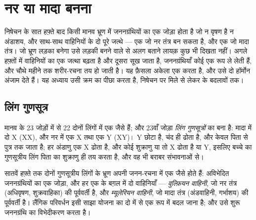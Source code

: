 \chapter{नर या मादा बनना}\label{ch:g11:becoming-male-female}

निषेचन के सात हफ़्ते बाद किसी मानव भ्रूण में जननग्रंथियों का एक जोड़ा होता
है जो न वृषण है न अंडाशय, और साथ-साथ वाहिनियों के दो पूरे जत्थे --- एक जो
नर तंत्र बन सकता है, और एक जो मादा तंत्र। जो भ्रूण लड़का बनेगा उसे लड़की
बनने वाले से अलग बताने लायक़ कुछ भी दिखता नहीं। अगले हफ़्तों में
वाहिनियों का एक जत्था बढ़ता है और दूसरा सूख जाता है, जननग्रंथियाँ कोई एक
रूप ले लेती हैं, और चौथे महीने तक शरीर-रचना तय हो जाती है। यह फ़ैसला अकेला
एक  करता है, और उसे दो हॉर्मोन अंजाम देते हैं। यह अध्याय उसी क्रम का
पीछा करता है, निषेचन पर मिले  से लेकर  के बदलावों तक।

\section{लिंग गुणसूत्र}

\begin{definition}[लिंग गुणसूत्र]\label{def:g11:becoming-male-female:chromosomes}
मानव  के 23 जोड़ों में से 22 दोनों लिंगों में एक जैसे हैं; और
23वाँ जोड़ा \emph{लिंग गुणसूत्रों} का बना है: मादा में
दो X  (XX), और नर में एक X तथा एक Y (XY)। Y छोटा है, चंद ही 
ढोता है, और केवल पिता से पुत्र तक जाता है; हर अंडाणु एक X ढोता है, और कोई
शुक्राणु या तो X ढोता है या Y, इसलिए बच्चे का गुणसूत्रीय लिंग पिता का
शुक्राणु ही तय करता है, और वह भी बराबर संभावनाओं से।
\end{definition}

\begin{proposition}[अविभेदित अवस्था]\label{prop:g11:becoming-male-female:undifferentiated}
सातवें हफ़्ते तक दोनों गुणसूत्रीय लिंगों के भ्रूण अपनी जनन-रचना में एक
जैसे होते हैं: अविभेदित जननग्रंथियों का एक जोड़ा, और हर एक के बग़ल में दो
वाहिनियाँ --- \emph{वुल्फ़ियन वाहिनी}, जो नर तंत्र (अधिवृषण, शुक्रवाहिका)
की पूर्ववर्ती है, और \emph{म्यूलेरियन वाहिनी}, जो मादा तंत्र (अंडवाहिनी,
गर्भाशय) की पूर्ववर्ती है। लैंगिक परिवर्धन इसी साझा योजना का दो में से एक
रूप में बदल जाना है; और उसे शुरू जननग्रंथि का विभेदीकरण करता है।
\end{proposition}
\admitted


